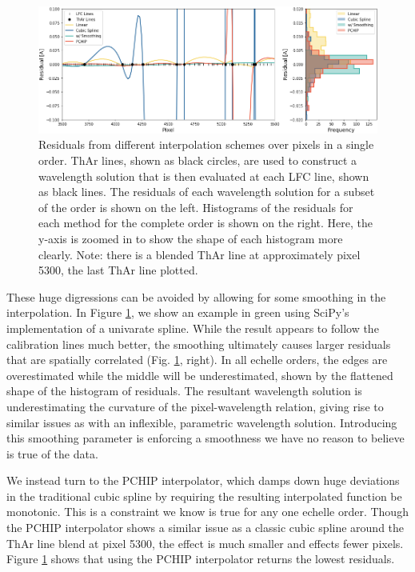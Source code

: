 \documentclass[modern]{aastex63}
\begin{document}
\begin{figure}[h]
\centering
\includegraphics[width=\textwidth]{Figures/intpx_tests.png}
\caption{Residuals from different interpolation schemes over pixels in a single order.  ThAr lines, shown as black circles, are used to construct a wavelength solution that is then evaluated at each LFC line, shown as black lines.  The residuals of each wavelength solution for a subset of the order is shown on the left.  Histograms of the residuals for each method for the complete order is shown on the right.  Here, the y-axis is zoomed in to show the shape of each histogram more clearly.  Note: there is a blended ThAr line at approximately pixel 5300, the last ThAr line plotted.}
\label{fig:xinterp}
\end{figure} 

These huge digressions can be avoided by allowing for some smoothing in the interpolation.  In Figure \ref{fig:xinterp}, we show an example in green using SciPy's implementation of a univarate spline.  While the result appears to follow the calibration lines much better, the smoothing ultimately causes larger residuals that are spatially correlated (Fig. \ref{fig:xinterp}, right).  In all echelle orders, the edges are overestimated while the middle will be underestimated, shown by the flattened shape of the histogram of residuals.  The resultant wavelength solution is underestimating the curvature of the pixel-wavelength relation, giving rise to similar issues as with an inflexible, parametric wavelength solution.  Introducing this smoothing parameter is enforcing a smoothness we have no reason to believe is true of the data.

We instead turn to the PCHIP interpolator, which damps down huge deviations in the traditional cubic spline by requiring the resulting interpolated function be monotonic.  This is a constraint we know is true for any one echelle order.  Though the PCHIP interpolator shows a similar issue as a classic cubic spline around the ThAr line blend at pixel 5300, the effect is much smaller and effects fewer pixels.  Figure \ref{fig:xinterp} shows that using the PCHIP interpolator returns the lowest residuals.  
\end{document}
